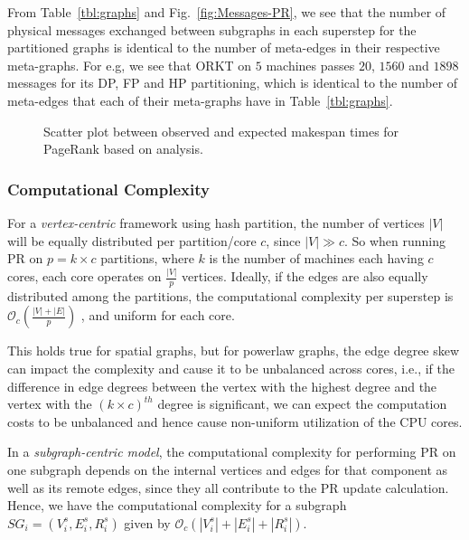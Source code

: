 \documentclass[10pt,conference, compsocconf]{IEEEtran}
\begin{document}
From Table~\ref{tbl:graphs} and Fig.~\ref{fig:Messages-PR}, we see that the number of physical messages exchanged between subgraphs in each superstep for the partitioned graphs is identical to the number of meta-edges in their respective meta-graphs. For e.g, we see that ORKT on $5$ machines passes $20$, $1560$ and $1898$ messages for its DP, FP and HP partitioning, which is identical to the number of meta-edges that each of their meta-graphs have in Table~\ref{tbl:graphs}.







\begin{figure*}[t!]
\centering {}
\caption{Scatter plot between observed and expected makespan times for PageRank based on analysis.}
\label{fig:pr:makespan}
\vspace{-0.1in}
\end{figure*}

\subsubsection{Computational Complexity}

For a \emph{vertex-centric} framework using hash partition, the number of vertices $|V|$ will be equally distributed per partition/core $c$, since $|V| \gg c$. So when running PR on $p=k\times c$ partitions, where $k$ is the number of machines each having $c$ cores, each core operates on $\frac{|V|}{p}$ vertices. Ideally, if the edges are also equally distributed among the partitions, the computational complexity per superstep is $\mathcal{O}_c(\frac{|V|+|E|}{p})$ , and uniform for each core. 

This holds true for spatial graphs, but for powerlaw graphs, the edge degree skew can impact the complexity and cause it to be unbalanced across cores, i.e., if the difference in edge degrees between the vertex with the highest degree and the vertex with the $(k \times c)^{th}$ degree is significant, we can expect the computation costs to be unbalanced and hence cause non-uniform utilization of the CPU cores.




In a \emph{subgraph-centric model}, the computational complexity for performing PR on one subgraph depends on the internal vertices and edges for that component as well as its remote edges, since they all contribute to the PR update calculation. Hence, we have the computational complexity for a subgraph $SG_i = (V^s_i, E^s_i, R^s_i)$ given by $\mathcal{O}_c(|V^s_i|+|E^s_i|+|R^s_i|)$.
\end{document}
